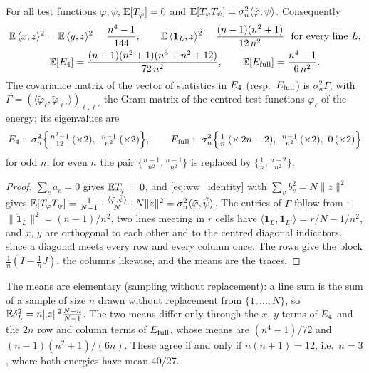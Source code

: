 \begin{proposition}
\label{prop:random_energy_moments}
For all test functions $\varphi,\psi$, $\mathbb{E}[T_\varphi]=0$ and $\mathbb{E}[T_\varphi T_\psi]=\sigma_n^2\langle\tilde\varphi,\tilde\psi\rangle$.
Consequently
\begin{gather}
\mathbb{E}\,\langle x,z\rangle^2=\mathbb{E}\,\langle y,z\rangle^2=\frac{n^4-1}{144},\qquad
\mathbb{E}\,\langle\mathbf 1_L,z\rangle^2=\frac{(n-1)(n^2+1)}{12\,n^2}\ \text{ for every line }L,
\label{eq:single_terms}\\
\mathbb{E}[E_4]=\frac{(n-1)(n^2+1)(n^3+n^2+12)}{72\,n^2},\qquad
\mathbb{E}[E_{\mathrm{full}}]=\frac{n^4-1}{6\,n^2}.
\label{eq:mean_low}
\end{gather}
The covariance matrix of the vector of statistics in $E_4$ (resp.\ $E_{\mathrm{full}}$) is $\sigma_n^2\Gamma$, with $\Gamma=(\langle\tilde\varphi_\ell,\tilde\varphi_{\ell'}\rangle)_{\ell,\ell'}$ the Gram matrix of the centred test functions $\varphi_\ell$ of the energy; its eigenvalues are
\begin{equation}
\Efour:\ \sigma_n^2\Bigl\{\tfrac{n^2-1}{12}\,(\times2),\ \tfrac{n-1}{n^2}\,(\times2)\Bigr\},
\qquad
\Efull:\ \sigma_n^2\Bigl\{\tfrac1n\,(\times\,2n-2),\ \tfrac{n-1}{n^2}\,(\times2),\ 0\,(\times2)\Bigr\}
\label{eq:weights}
\end{equation}
for odd $n$; for even $n$ the pair $\{\tfrac{n-1}{n^2},\tfrac{n-1}{n^2}\}$ is replaced by $\{\tfrac1n,\tfrac{n-2}{n^2}\}$.
\end{proposition}

\begin{proof}
$\sum_ca_c=0$ gives $\mathbb{E} T_\varphi=0$, and \eqref{eq:ww_identity} with $\sum_vb_v^2=N\|z\|^2$ gives $\mathbb{E}[T_\varphi T_\psi]=\frac1{N-1}\cdot\frac{\langle\tilde\varphi,\tilde\psi\rangle}{N}\cdot N\|z\|^2=\sigma_n^2\langle\tilde\varphi,\tilde\psi\rangle$.
The entries of $\Gamma$ follow from : $\|\tilde{\mathbf 1}_L\|^2=(n-1)/n^2$, two lines meeting in $r$ cells have $\langle\tilde{\mathbf 1}_L,\tilde{\mathbf 1}_{L'}\rangle=r/N-1/n^2$, and $x$, $y$ are orthogonal to each other and to the centred diagonal indicators, since a diagonal meets every row and every column once.
The rows give the block $\frac1n(I-\frac1nJ)$, the columns likewise, and the means are the traces.
\end{proof}

The means are elementary (sampling without replacement): a line sum is the sum of a sample of size $n$ drawn without replacement from $\{1,\dots,N\}$, so $\mathbb{E}\delta_L^2=n\|z\|^2\frac{N-n}{N-1}$.
The two means differ only through the $x$, $y$ terms of $E_4$ and the $2n$ row and column terms of $E_{\mathrm{full}}$, whose means are $(n^4-1)/72$ and $(n-1)(n^2+1)/(6n)$.
These agree if and only if $n(n+1)=12$, i.e.\ $n=3$, where both energies have mean $40/27$.

